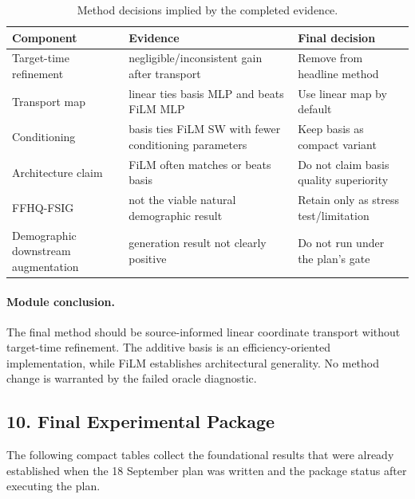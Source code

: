 \documentclass{article}
\begin{document}
\begin{table}[h]
\caption{Method decisions implied by the completed evidence.}
\label{tab:simplifications}
\centering
\small
\begin{tabular}{p{}p{}p{}}
\toprule
Component & Evidence & Final decision \\
\midrule
Target-time refinement & negligible/inconsistent gain after transport & Remove from headline method \\
Transport map & linear ties basis MLP and beats FiLM MLP & Use linear map by default \\
Conditioning & basis ties FiLM SW with fewer conditioning parameters & Keep basis as compact variant \\
Architecture claim & FiLM often matches or beats basis & Do not claim basis quality superiority \\
FFHQ-FSIG & not the viable natural demographic result & Retain only as stress test/limitation \\
Demographic downstream augmentation & generation result not clearly positive & Do not run under the plan's gate \\
\bottomrule
\end{tabular}
\end{table}

\paragraph{Module conclusion.}
The final method should be source-informed linear coordinate transport without target-time refinement. The additive basis is an efficiency-oriented implementation, while FiLM establishes architectural generality. No method change is warranted by the failed oracle diagnostic.

\subsection{10. Final Experimental Package}

The following compact tables collect the foundational results that were already established when the 18 September plan was written and the package status after executing the plan.
\end{document}
